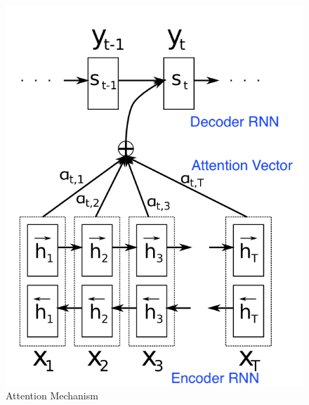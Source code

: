 \documentclass{article} \usepackage{tabularx}
\begin{document}
\begin{figure}
  \centering
  \includegraphics[scale=0.5]{images/attention.png}
  \caption{Attention Mechanism}
  \label{fig:attention}
\end{figure}
\end{document}

